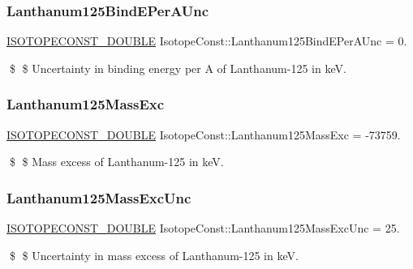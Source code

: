 \subsubsection{\texorpdfstring{Lanthanum125\+Bind\+E\+Per\+A\+Unc}{Lanthanum125BindEPerAUnc}}
{\footnotesize\ttfamily \mbox{\hyperlink{group___isotope_const-_macros_ga8f45a7272ce02c0b4c65c44636ed719a}{I\+S\+O\+T\+O\+P\+E\+C\+O\+N\+S\+T\+\_\+\+D\+O\+U\+B\+LE}} Isotope\+Const\+::\+Lanthanum125\+Bind\+E\+Per\+A\+Unc = 0.}

\$ \$ Uncertainty in binding energy per A of Lanthanum-\/125 in keV. \mbox{\label{group___isotope_const-_lanthanum-_la125_gaed6323da5be7b9bd49c731d5c9503386}} 
\subsubsection{\texorpdfstring{Lanthanum125\+Mass\+Exc}{Lanthanum125MassExc}}
{\footnotesize\ttfamily \mbox{\hyperlink{group___isotope_const-_macros_ga8f45a7272ce02c0b4c65c44636ed719a}{I\+S\+O\+T\+O\+P\+E\+C\+O\+N\+S\+T\+\_\+\+D\+O\+U\+B\+LE}} Isotope\+Const\+::\+Lanthanum125\+Mass\+Exc = -\/73759.}

\$ \$ Mass excess of Lanthanum-\/125 in keV. \mbox{\label{group___isotope_const-_lanthanum-_la125_ga0fa21ed1b9734268131ac36a0bcced41}} 
\subsubsection{\texorpdfstring{Lanthanum125\+Mass\+Exc\+Unc}{Lanthanum125MassExcUnc}}
{\footnotesize\ttfamily \mbox{\hyperlink{group___isotope_const-_macros_ga8f45a7272ce02c0b4c65c44636ed719a}{I\+S\+O\+T\+O\+P\+E\+C\+O\+N\+S\+T\+\_\+\+D\+O\+U\+B\+LE}} Isotope\+Const\+::\+Lanthanum125\+Mass\+Exc\+Unc = 25.}

\$ \$ Uncertainty in mass excess of Lanthanum-\/125 in keV. \mbox{\label{group___isotope_const-_lanthanum-_la125_gafd5535a90fab4444df54172f4a955a2a}} 

